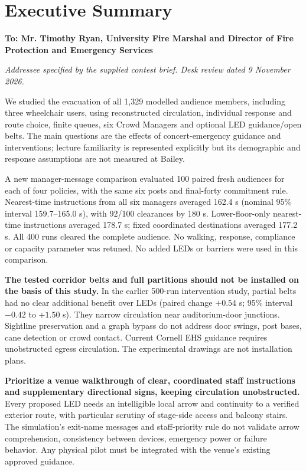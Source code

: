 \section*{Executive Summary}
\noindent\textbf{To: Mr. Timothy Ryan, University Fire Marshal and Director of Fire Protection and Emergency Services}\par
\noindent\textit{Addressee specified by the supplied contest brief. Desk review dated 9 November 2026.}

We studied the evacuation of all 1,329 modelled audience members, including three wheelchair users, using reconstructed circulation, individual response and route choice, finite queues, six Crowd Managers and optional LED guidance/open belts. The main questions are the effects of concert-emergency guidance and interventions; lecture familiarity is represented explicitly but its demographic and response assumptions are not measured at Bailey.

A new manager-message comparison evaluated 100 paired fresh audiences for each of four policies, with the same six posts and final-forty commitment rule. Nearest-time instructions from all six managers averaged 162.4 s (nominal 95\% interval 159.7--165.0 s), with 92/100 clearances by 180 s. Lower-floor-only nearest-time instructions averaged 178.7 s; fixed coordinated destinations averaged 177.2 s. All 400 runs cleared the complete audience. No walking, response, compliance or capacity parameter was retuned. No added LEDs or barriers were used in this comparison.

\textbf{The tested corridor belts and full partitions should not be installed on the basis of this study.} In the earlier 500-run intervention study, partial belts had no clear additional benefit over LEDs (paired change $+0.54$ s; 95\% interval $-0.42$ to $+1.50$ s). They narrow circulation near auditorium-door junctions. Sightline preservation and a graph bypass do not address door swings, post bases, cane detection or crowd contact. Current Cornell EHS guidance requires unobstructed egress circulation. The experimental drawings are not installation plans.

\textbf{Prioritize a venue walkthrough of clear, coordinated staff instructions and supplementary directional signs, keeping circulation unobstructed.} Every proposed LED needs an intelligible local arrow and continuity to a verified exterior route, with particular scrutiny of stage-side access and balcony stairs. The simulation's exit-name messages and staff-priority rule do not validate arrow comprehension, consistency between devices, emergency power or failure behavior. Any physical pilot must be integrated with the venue's existing approved guidance.

